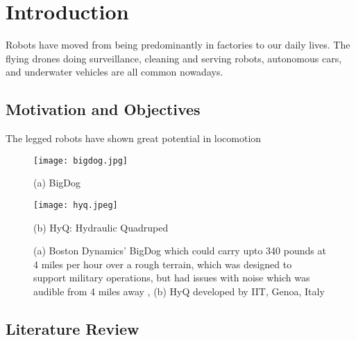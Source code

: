 
\chapter{Introduction} %

\label{Chapter1} %


Robots have moved from being predominantly in factories to our daily lives. The flying drones doing surveillance, cleaning and serving robots, autonomous cars, and underwater vehicles are all common nowadays.

\section{Motivation and Objectives}

The legged robots have shown great potential in locomotion

\begin{figure}[!htb]
\centering
\begin{minipage}{.5\textwidth}
  \centering
  \texttt{[image: bigdog.jpg]}
  \caption*{(a) BigDog}
\end{minipage}%
\begin{minipage}{.5\textwidth}
  \centering
  \texttt{[image: hyq.jpeg]}
  \caption*{(b) HyQ: Hydraulic Quadruped}
\end{minipage}
\caption[(a) Boston Dynamics' BigDog, (b) HyQ developed by IIT, Genoa, Italy]{(a) Boston Dynamics' BigDog which could carry upto 340 pounds at 4 miles per hour over a rough terrain, which was designed to support military operations, but had issues with noise which was audible from 4 miles away \citep{raibert2008bigdog}, (b) HyQ developed by IIT, Genoa, Italy\citep{semini2011design}}
\end{figure}


\section{Literature Review}

